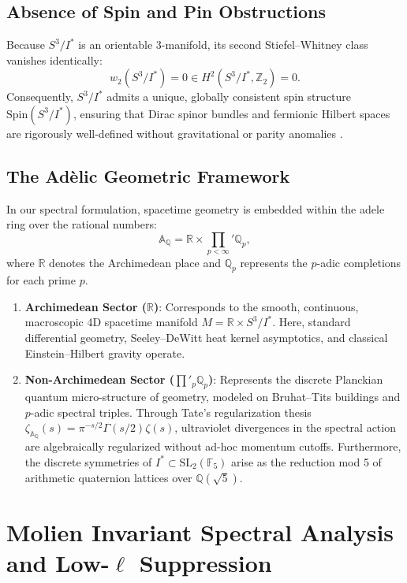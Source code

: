\documentclass[11pt,a4paper]{article}
\theoremstyle{definition}
\newcommand{\R}{\mathbb{R}}
\newcommand{\Z}{\mathbb{Z}}
\newcommand{\Q}{\mathbb{Q}}
\newcommand{\Qp}{\mathbb{Q}_p}
\newcommand{\Adele}{\mathbb{A}_\mathbb{Q}}
\newcommand{\PDS}{S^3 / I^*}
\newcommand{\Istar}{I^*}
\begin{document}
\subsection{Absence of Spin and Pin Obstructions}
Because $\PDS$ is an orientable 3-manifold, its second Stiefel--Whitney class vanishes identically:
\begin{equation}
    w_2(\PDS) = 0 \in H^2(\PDS, \Z_2) = 0.
\end{equation}
Consequently, $\PDS$ admits a unique, globally consistent spin structure $\mathrm{Spin}(\PDS)$, ensuring that Dirac spinor bundles and fermionic Hilbert spaces are rigorously well-defined without gravitational or parity anomalies \cite{LawsonMichelsohn1989}.

\subsection{The Ad\`elic Geometric Framework}
\label{sec:adelic}
In our spectral formulation, spacetime geometry is embedded within the adele ring over the rational numbers:
\begin{equation}
    \Adele = \R \times {\prod_{p < \infty}}' \Qp,
\end{equation}
where $\R$ denotes the Archimedean place and $\Qp$ represents the $p$-adic completions for each prime $p$.
\begin{enumerate}
    \item \textbf{Archimedean Sector ($\R$)}: Corresponds to the smooth, continuous, macroscopic 4D spacetime manifold $M = \R \times \PDS$. Here, standard differential geometry, Seeley--DeWitt heat kernel asymptotics, and classical Einstein--Hilbert gravity operate.
    \item \textbf{Non-Archimedean Sector (${\prod'_p} \Qp$)}: Represents the discrete Planckian quantum micro-structure of geometry, modeled on Bruhat--Tits buildings and $p$-adic spectral triples. Through Tate's regularization thesis $\zeta_\Adele(s) = \pi^{-s/2} \Gamma(s/2) \zeta(s)$, ultraviolet divergences in the spectral action are algebraically regularized without ad-hoc momentum cutoffs. Furthermore, the discrete symmetries of $\Istar \subset \mathrm{SL}_2(\mathbb{F}_5)$ arise as the reduction mod 5 of arithmetic quaternion lattices over $\Q(\sqrt{5})$.
\end{enumerate}

\section{Molien Invariant Spectral Analysis and Low-$\ell$ Suppression}
\label{sec:molien}
\end{document}
